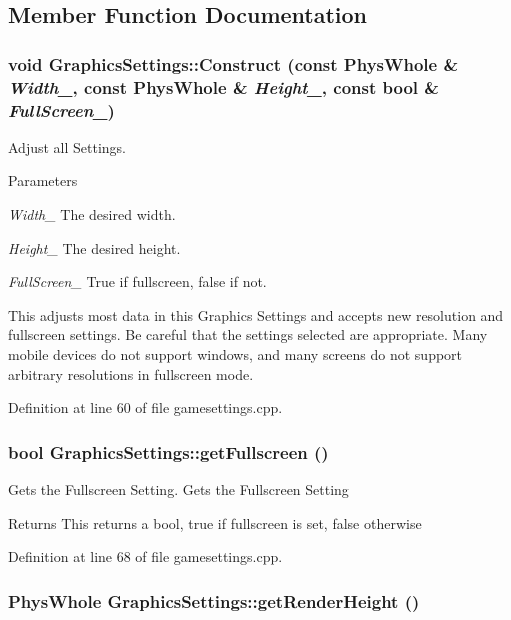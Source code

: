\subsection{Member Function Documentation}
\hypertarget{classGraphicsSettings_afd15d9badf37bb54c55e0667b3061c37}{
\subsubsection[{Construct}]{\setlength{\rightskip}{0pt plus 5cm}void GraphicsSettings::Construct (const PhysWhole \& {\em Width\_\-}, \/  const PhysWhole \& {\em Height\_\-}, \/  const bool \& {\em FullScreen\_\-})}}
\label{de/de6/classGraphicsSettings_afd15d9badf37bb54c55e0667b3061c37}


Adjust all Settings. 
\begin{DoxyParams}{Parameters}
\item[{\em Width\_\-}]The desired width. \item[{\em Height\_\-}]The desired height. \item[{\em FullScreen\_\-}]True if fullscreen, false if not.\end{DoxyParams}
This adjusts most data in this Graphics Settings and accepts new resolution and fullscreen settings. Be careful that the settings selected are appropriate. Many mobile devices do not support windows, and many screens do not support arbitrary resolutions in fullscreen mode. 

Definition at line 60 of file gamesettings.cpp.\hypertarget{classGraphicsSettings_a4293e8643a4ed575f682636e748782d1}{
\subsubsection[{getFullscreen}]{\setlength{\rightskip}{0pt plus 5cm}bool GraphicsSettings::getFullscreen ()}}
\label{de/de6/classGraphicsSettings_a4293e8643a4ed575f682636e748782d1}


Gets the Fullscreen Setting. Gets the Fullscreen Setting \begin{DoxyReturn}{Returns}
This returns a bool, true if fullscreen is set, false otherwise 
\end{DoxyReturn}


Definition at line 68 of file gamesettings.cpp.\hypertarget{classGraphicsSettings_a099b5293b27204694bb3960ed713ad16}{
\subsubsection[{getRenderHeight}]{\setlength{\rightskip}{0pt plus 5cm}PhysWhole GraphicsSettings::getRenderHeight ()}}
\label{de/de6/classGraphicsSettings_a099b5293b27204694bb3960ed713ad16}


